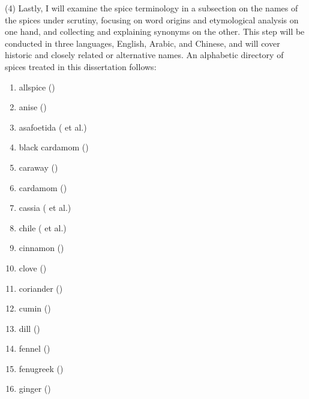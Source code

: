 (4) Lastly, I will examine the spice terminology in a subsection on the names of the spices under scrutiny, focusing on word origins and etymological analysis on one hand, and collecting and explaining synonyms on the other. This step will be conducted in three languages, English, Arabic, and Chinese, and will cover historic and closely related or alternative names. An alphabetic directory of spices treated in this dissertation follows:


\begin{multicols}{2}
\begin{enumerate}
    \item allspice () \quad \hfill  \pageref{sec:allspice}
    \item anise () \quad \hfill \pageref{sec:anise}
    \item asafoetida ( et al.) \quad \hfill \pageref{sec:asafoetida}
    \item black cardamom () \quad \hfill \pageref{sec:black_cardamom}
    \item caraway () \quad \hfill \pageref{sec:caraway}
    \item cardamom () \quad \hfill \pageref{sec:cardamom}
    \item cassia ( et al.) \quad \hfill \pageref{sec:cassia}
    \item chile ( et al.) \quad \hfill \pageref{sec:chile}
    \item cinnamon () \quad \hfill \pageref{sec:cinnamon}
    \item clove () \quad \hfill \pageref{sec:clove}
    \item coriander () \quad \hfill \pageref{sec:coriander}
    \item cumin () \quad \hfill \pageref{sec:cumin}
    \item dill () \quad \hfill \pageref{sec:dill}
    \item fennel () \quad \hfill \pageref{sec:fennel}
    \item fenugreek () \quad \hfill \pageref{sec:fenugreek}
    \item ginger () \quad \hfill \pageref{sec:ginger}

\end{enumerate}
\end{multicols}
